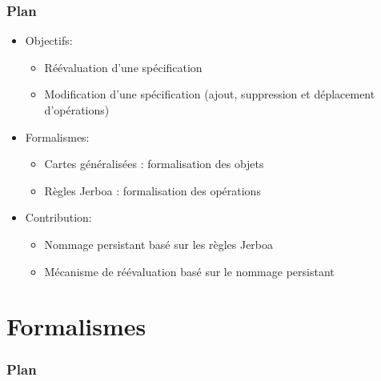 \documentclass[]{beamer}
\begin{document}
\begin{frame}
	\frametitle{Plan}
	\begin{itemize}
		\item Objectifs:
		      \begin{itemize}
			      \item Réévaluation d'une spécification
			      \item Modification d'une spécification (ajout, suppression et
			            déplacement d'opérations)
		      \end{itemize}

		      \vspace{1em}

		\item Formalismes:
		      \begin{itemize}
			      \item Cartes généralisées : formalisation des objets
			      \item Règles Jerboa : formalisation des opérations
		      \end{itemize}

		      \vspace{1em}

		\item Contribution:
		      \begin{itemize}
			      \item Nommage persistant basé sur les règles Jerboa
			      \item Mécanisme de réévaluation basé sur le nommage persistant
		      \end{itemize}
	\end{itemize}
\end{frame}

\section{Formalismes}
\begin{frame}
	\frametitle{Plan}
	\tableofcontents[currentsection]
\end{frame}
\end{document}
